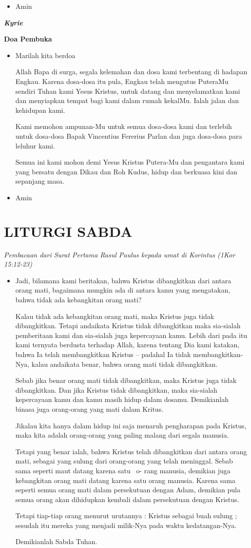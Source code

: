 \documentclass[titlepage,10pt,openany]{scrbook}
\makeatletter
\newcommand{\subjudul}[1]{%
  {\parindent \z@ 
    \interlinepenalty\@M \bfseries #1\par\nobreak \vskip 10\p@ }}
\newcommand{\lagu}[1]{%
  {\parindent \z@ 
    \interlinepenalty\@M \slshape \bfseries \normalsize \textit{#1}\par\nobreak \vskip 10\p@ }}
\newcommand{\keterangan}[1]{%
  {\parindent \z@  \slshape 
    \interlinepenalty\@M \textsl{#1}\par\nobreak  \vskip 5\p@}}
\newcommand{\BU}[1]{\begin{itemize} \item[U:] #1 \end{itemize}}
\newcommand{\BI}[1]{\begin{itemize} \item[I:] #1 \end{itemize}}
\newcommand{\BP}[1]{\begin{itemize} \item[P:] #1 \end{itemize}}
\newcommand{\namaalm}{Bapak Vincentius Fererius Parlan }
\makeatother
\begin{document}
\BU{Amin}

\lagu{Kyrie} 
 

\subjudul{Doa Pembuka}

\BI{Marilah kita berdoa 

Allah Bapa di surga, segala kelemahan dan dosa kami 
terbentang di hadapan Engkau. Karena dosa-dosa itu 
pula, Engkau telah mengutus PuteraMu sendiri Tuhan 
kami Yesus Kristus, untuk datang dan menyelamatkan 
kami dan menyiapkan tempat bagi kami dalam rumah 
kekalMu. Ialah jalan dan kehidupan kami. 

Kami memohon ampunan\hyp Mu untuk semua dosa\hyp dosa kami 
dan terlebih untuk dosa\hyp dosa \namaalm dan juga dosa\hyp dosa para leluhur kami. 

Semua ini kami mohon demi Yesus Kristus Putera\hyp Mu dan pengantara kami yang bersatu dengan Dikau dan Roh Kudus, hidup dan berkuasa kini dan sepanjang masa.}

\BU{Amin}

 

\section*{LITURGI SABDA} 

\keterangan{Pembacaan dari Surat Pertama Rasul Paulus kepada umat di
Korintus (1Kor 15:12-23)}

\BP{Jadi, bilamana kami beritakan, bahwa Kristus dibangkitkan
dari antara orang mati, bagaimana mungkin ada di antara kamu
yang mengatakan, bahwa tidak ada kebangkitan orang mati?

Kalau tidak ada kebangkitan orang mati, maka Kristus juga
tidak dibangkitkan. Tetapi andaikata Kristus tidak dibangkitkan
maka sia-sialah pemberitaan kami dan sia-sialah juga
kepercayaan kamu. Lebih dari pada itu kami ternyata berdusta
terhadap Allah, karena tentang Dia kami katakan, bahwa Ia telah
membangkitkan Kristus -- padahal Ia tidak membangkitkan\hyp Nya,
kalau andaikata benar, bahwa orang mati tidak dibangkitkan.

Sebab jika benar orang mati tidak dibangkitkan, maka Kristus
juga tidak dibangkitkan. Dan jika Kristus tidak dibangkitkan,
maka sia-sialah kepercayaan kamu dan kamu masih hidup
dalam dosamu. 
Demikianlah binasa juga orang-orang yang mati
dalam Kritus. 

Jikalau kita hanya dalam hidup ini saja
menaruh pengharapan pada Kristus, maka kita adalah orang-\-orang yang paling malang dari segala manusia. 

Tetapi yang
benar ialah, bahwa Kristus telah dibangkitkan dari antara orang
mati, sebagai yang sulung dari orang-orang yang telah
meninggal. Sebab sama seperti maut datang karena satu ~o- rang
manusia, demikian juga kebangkitan orang mati datang karena
satu orang manusia. Karena sama seperti semua orang mati
dalam persekutuan dengan Adam, demikian pula semua orang
akan dihidupkan kembali dalam persekutuan dengan Kristus.

Tetapi tiap-tiap orang menurut urutannya : Kristus sebagai buah
sulung ; sesudah itu mereka yang menjadi milik\hyp Nya pada waktu
kedatangan\hyp Nya.

Demikianlah Sabda Tuhan.}
\end{document}

